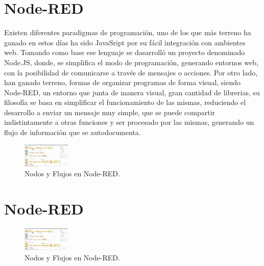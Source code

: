 \documentclass[conference]{IEEEtran}
\begin{document}
\section{Node-RED}
Existen diferentes paradigmas de programación, uno de los que más terreno ha ganado en estos días ha sido JavaSript por su fácil integración con ambientes web. Tomando como base ese lenguaje se dasarrolló un proyecto denominado Node.JS, donde, se simplifica el modo de programación, generando entornos web, con la posibilidad de comunicarse a través de mensajes o acciones. Por otro lado, han ganado terreno, formas de organizar programas de forma visual, siendo Node-RED, un entorno que junta de manera visual, gran cantidad de librerias, su filosofía se basa en simplificar el funcionamiento de las mismas, reduciendo el desarrollo a enviar un mensaje muy simple, que se puede compartir indistintamente a otras funciones y ser procesado por las mismas, generando un flujo de información que se autodocumenta.

\begin{figure}[H]
\begin{center}
\includegraphics[width=0.2\textwidth]{imagenes/node.eps} 
\caption{ Nodos y Flujos en Node-RED.}
\label{fig:hiper2}
\end{center}
\end{figure}    


\section{Node-RED}
 \begin{figure}[H]
\begin{center}
\includegraphics[width=0.2\textwidth]{imagenes/node.eps} 
\caption{ Nodos y Flujos en Node-RED.}
\label{fig:hiper2}
\end{center}
\end{figure}    
\end{document}
